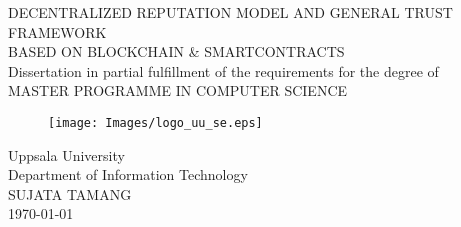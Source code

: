 
\thispagestyle{empty}

\vspace*{+5em}
\begin{center}
DECENTRALIZED REPUTATION MODEL AND GENERAL TRUST FRAMEWORK\\
BASED ON BLOCKCHAIN \& SMARTCONTRACTS \\
\vspace*{+8em}
Dissertation in partial fulfillment of the requirements for the degree of\\
\vspace{+2em}
MASTER PROGRAMME IN COMPUTER SCIENCE\\

\vspace*{+3em}
\begin{figure}[H]
\centering
\texttt{[image: Images/logo\_uu\_se.eps]}
\end{figure}

\vspace*{+3em}
Uppsala University\\
Department of Information Technology\\
\vspace*{+2em}
SUJATA TAMANG\\

\vspace*{+12em}
\today
\end{center}
